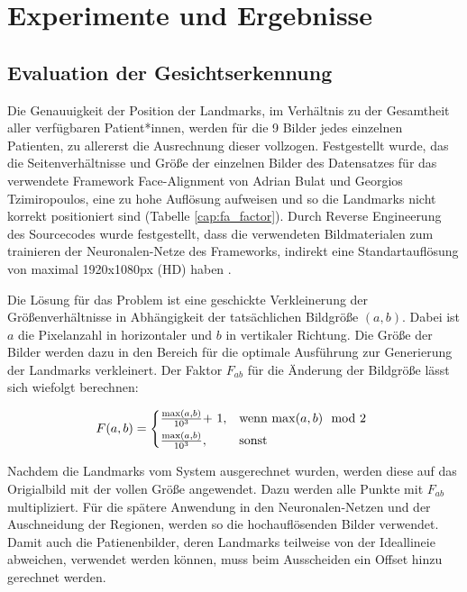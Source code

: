 \chapter{Experimente und Ergebnisse}\label{experiment}

\section{Evaluation der Gesichtserkennung}\label{evalfa}
Die Genauuigkeit der Position der Landmarks, im Verhältnis zu der Gesamtheit aller verfügbaren Patient*innen, werden für die 9 Bilder jedes einzelnen Patienten, zu allererst die Ausrechnung dieser vollzogen. Festgestellt wurde, das die Seitenverhältnisse und Größe der einzelnen Bilder des Datensatzes für das verwendete Framework \glqq Face-Alignment\grqq{} von Adrian Bulat und Georgios Tzimiropoulos, eine zu hohe Auflösung aufweisen und so die Landmarks nicht korrekt positioniert sind (Tabelle \ref{cap:fa_factor}). Durch Reverse Engineerung des Sourcecodes wurde festgestellt, dass die verwendeten Bildmaterialen zum trainieren der Neuronalen-Netze des Frameworks, indirekt eine Standartauflösung von maximal 1920x1080px (HD) haben \cite{fa_framework}.


Die Lösung für das Problem ist eine geschickte Verkleinerung der Größenverhältnisse in Abhängigkeit der tatsächlichen Bildgröße $(a, b)$. Dabei ist $a$ die Pixelanzahl in horizontaler und $b$ in vertikaler Richtung. Die Größe der Bilder werden dazu in den Bereich für die optimale Ausführung zur Generierung der Landmarks verkleinert. Der Faktor $F_{ab}$ für die Änderung der Bildgröße lässt sich wiefolgt berechnen:

\begin{equation}
F(a, b) = \begin{cases*}
  \frac{\max(a, b)}{10^{3}} $+ 1$,  & wenn $\max(a, b) \mod 2$  \\
  \frac{\max(a, b)}{10^{3}},        & sonst
\end{cases*}
\end{equation}

Nachdem die Landmarks vom System ausgerechnet wurden, werden diese auf das Origialbild mit der vollen Größe angewendet. Dazu werden alle Punkte mit $F_{ab}$ multipliziert. Für die spätere Anwendung in den Neuronalen-Netzen und der Auschneidung der Regionen, werden so die hochauflösenden Bilder verwendet. Damit auch die Patienenbilder, deren Landmarks teilweise von der Ideallineie abweichen, verwendet werden können, muss beim Ausscheiden ein Offset hinzu gerechnet werden.




